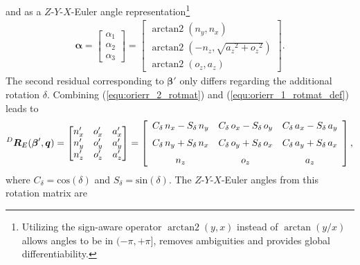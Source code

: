 \documentclass[robotics,article,submit,moreauthors,pdftex]{Definitions/mdpi}
\newcommand{\bm}[1]{\boldsymbol{#1}}
\DeclareMathOperator{\arctantwo}{arctan2}
\newcommand{\rotmat}[2]{{{ }^{#1}\boldsymbol{R}}_{#2}}
\begin{document}
%
and as a $Z$-$Y$-$X$-Euler angle representation\footnote{Utilizing the sign-aware operator $\arctantwo(y,x)$ instead of $\arctan(y/x)$ allows angles to be in $(-\pi,+\pi]$, removes ambiguities and provides global differentiability.}
%
\begin{align}
    \bm{\alpha}
    =
    \begin{bmatrix}
    \alpha_1 \\
    \alpha_2 \\
    \alpha_3
    \end{bmatrix}
    =
    \begin{bmatrix}
        \arctantwo \left( {n_y} , { n_x} \right) \\ 
        \arctantwo \left( -{n_z} , \sqrt {{{a_z}}^{2}+{{ o_z}}^{2}} \right) \\ 
        \arctantwo \left( {o_z} , {a_z} \right)
    \end{bmatrix}.
    \label{equ:alpha_zyx}
\end{align}
%
The second residual corresponding to $\bm{\beta}'$ only differs regarding the additional rotation $\delta$. Combining (\ref{equ:orierr_2_rotmat}) and (\ref{equ:orierr_1_rotmat_def}) leads to
%
\begin{align}
    \rotmat{D}{E}(\bm{\beta}',\bm{q})
    =
    \begin{bmatrix}
    {n'_x}&{o'_x}&{a'_x} \\
    {n'_y}&{o'_y}&{a'_y} \\ 
    {n'_z}&{o'_z}&{a'_z} \\ 
    \end{bmatrix}
    = 
    \left[ \begin {array}{ccc} { C_{\delta}}\,{n_x}-{ S_{\delta}}\,{ n_y}&{ C_{\delta}}\,{o_x}-{ S_{\delta}}\,{o_y}&{ C_{\delta}}\,{ a_x}-{ S_{\delta}}\,{a_y}\\ \noalign{\medskip}{ C_{\delta}}\,{n_y}+ { S_{\delta}}\,{n_x}&{ C_{\delta}}\,{o_y}+{ S_{\delta}}\,{o_x}&{ C_{\delta}}\,{a_y}+{ S_{\delta}}\,{a_x}\\ \noalign{\medskip}{ n_z}&{o_z}&{a_z}\end {array} \right], \nonumber
\end{align}
%
where $C_{\delta}=\mathrm{cos}(\delta)$ and $S_{\delta}=\mathrm{sin}(\delta)$.
The $Z$-$Y$-$X$-Euler angles from this rotation matrix are
%
\end{document}
